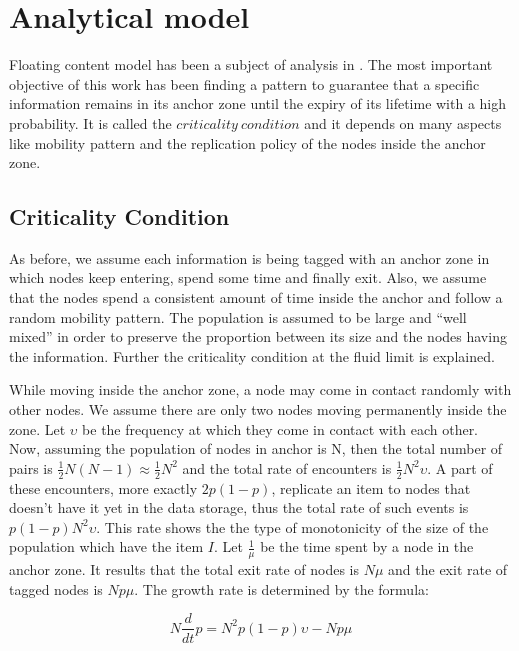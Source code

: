 \section {Analytical model}

Floating content model has been a subject of analysis in
\cite{whendoesdatafloats} . The most important objective of this work has been
finding a pattern to guarantee that a specific information remains in its anchor
zone until the expiry of its lifetime with a high probability. It is called the
$criticality\ condition$ and it depends on many aspects like mobility pattern
and the replication policy of the nodes inside the anchor zone. 

\subsection{Criticality Condition}

As before, we assume each information is being tagged with an anchor zone in
which nodes keep entering, spend some time and finally exit. Also, we assume
that the nodes spend a consistent amount of time inside the anchor and
follow a random mobility pattern. The population is assumed to be large and ``well
mixed'' in order to preserve the proportion between its size and the nodes
having the information. Further the criticality condition at the
fluid limit is explained.

While moving inside the anchor zone, a node may come in contact randomly
with other nodes. We assume there are only two nodes moving permanently inside
the zone. Let $\upsilon$ be the frequency at which they come in contact with
each other. Now, assuming the population of nodes in anchor is N, then the total
number of pairs is $\frac{1}{2}N(N-1) \approx \frac{1}{2}N^2$ and the total rate
of encounters is $\frac{1}{2}N^2\upsilon$. A part of these encounters, more
exactly $2p(1-p)$, replicate an item to nodes that doesn't have it yet in the
data storage, thus the total rate of such events is $p(1-p)N^2\upsilon$. This
rate shows the the type of monotonicity of the size of the population which have
the item $I$. Let $\frac{1}{\mu}$ be the time spent by a node in the anchor
zone. It results that the total exit rate of nodes is $N\mu$ and the exit rate
of tagged nodes is $Np\mu$. The growth rate is determined by the formula:

\begin{equation}
N\frac{d}{dt}p = N^2p(1-p)\upsilon - Np\mu \label{eq:derivative}
\end{equation}

